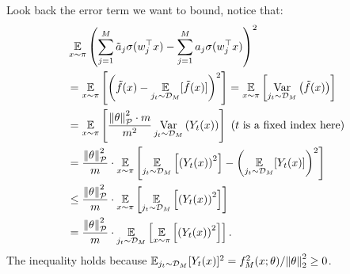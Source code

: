\begin{answer}
    Look back the error term we want to bound, notice that:
    \begin{align*}
        &\operatorname*{\mathbb{E}}_{x \sim \pi} \left( \sum_{j=1}^M \tilde{a}_j \sigma(w_j^{\top} x) - \sum_{j=1}^M a_j \sigma(w_j^{\top} x) \right)^2 \\
         &= \operatorname*{\mathbb{E}}_{x \sim \pi} \left[\left(\tilde{f}(x) - \operatorname*{\mathbb{E}}_{j_t \sim \mathcal{D}_M}[\tilde{f}(x)]\right)^2\right] = \operatorname*{\mathbb{E}}_{x \sim \pi} \left[\operatorname*{Var}_{j_t \sim \mathcal{D}_M}\left( \tilde{f}(x) \right)\right] \\
        &= \operatorname*{\mathbb{E}}_{x\sim \pi} \left[\frac{\norm{\theta}_\mathcal{P}^2 \cdot m}{m^2} \operatorname*{Var}_{j_t \sim \mathcal{D}_M}\left(Y_t(x)\right)\right] \text{ ($t$ is a fixed index here)}\\
        &= \frac{\norm{\theta}_{\mathcal{P}}^2}{m} \cdot \operatorname*{\mathbb{E}}_{x\sim \pi} \left[\operatorname*{\mathbb{E}}_{j_t\sim \mathcal{D}_M}\left[\left(Y_t(x)\right)^2\right] - \left(\operatorname*{\mathbb{E}}_{j_t\sim \mathcal{D}_M} [Y_t(x)]\right)^2\right] \\
        &\le \frac{\norm{\theta}_{\mathcal{P}}^2}{m} \cdot \operatorname*{\mathbb{E}}_{x\sim \pi} \left[\operatorname*{\mathbb{E}}_{j_t\sim \mathcal{D}_M}\left[\left(Y_t(x)\right)^2\right]\right]  \\
        &= \frac{\norm{\theta}_{\mathcal{P}}^2}{m} \cdot  \operatorname*{\mathbb{E}}_{j_t\sim \mathcal{D}_M}\left[\operatorname*{\mathbb{E}}_{x\sim \pi}\left[\left(Y_t(x)\right)^2\right]\right].
    \end{align*}
    The inequality holds because $\operatorname*{\mathbb{E}}_{j_t\sim \mathcal{D}_M} [Y_t(x)]^2 = f^2_M(x; \theta) / \norm{\theta}_2^2 \ge 0$.
    

\end{answer}
